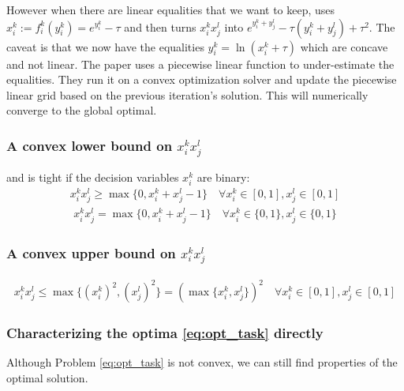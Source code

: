 However when there are linear equalities that we want to keep, \cite{porn2008global} uses $x_i^k:= f_i^k(y_i^k) = e^{y_i^k}-\tau$ and then turns $x_i^kx_j^l$ into $e^{y_i^k+y_j^l}-\tau(y_i^k+y_j^l)+\tau^2$.
The caveat is that we now have the equalities $y_i^k=\ln (x_i^k+\tau)$ which are concave and not linear.
The paper uses a piecewise linear function to under-estimate the equalities.
They run it on a convex optimization solver and update the piecewise linear grid based on the previous iteration's solution.
This will numerically converge to the global optimal.

\subsubsection{A convex lower bound on $x_i^kx_j^l$} and is tight if the decision variables $x_i^k$ are binary:
\begin{align}
	x_i^kx_j^l \geq \max\{0,x_i^k+x_j^l-1\} \quad \forall x_i^k\in[0,1],x_j^l\in[0,1]
\end{align}
\begin{align}
	x_i^kx_j^l = \max\{0,x_i^k+x_j^l-1\} \quad \forall x_i^k\in\{0,1\},x_j^l\in\{0,1\}
\end{align}

\subsubsection{A convex upper bound on $x_i^kx_j^l$}
\begin{align}
	x_i^kx_j^l \leq \max\{(x_i^k)^2,(x_j^l)^2\}=(\max\{x_i^k,x_j^l\})^2 \quad \forall x_i^k\in[0,1],x_j^l\in[0,1]
\end{align}


\subsubsection{Characterizing the optima \eqref{eq:opt_task} directly}
Although Problem \eqref{eq:opt_task} is not convex, we can still find properties of the optimal solution.

